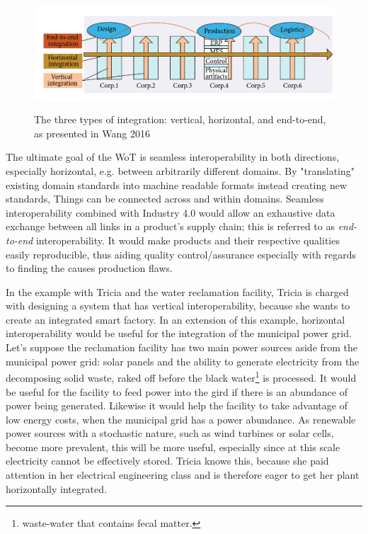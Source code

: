 \begin{figure}[th]
\centering
\includegraphics[width=\textwidth]{Figures/integration.png}
\caption{The three types of integration: vertical, horizontal, and end-to-end, as presented in Wang 2016}
\cite{wang2016implementing}
\label{fig:wangIntegration}
\end{figure}

The ultimate goal of the WoT is seamless interoperability in both directions, especially horizontal, e.g. between arbitrarily different domains. By "translating" existing domain standards into machine readable formats instead creating new standards, Things can be connected across and within domains\cite{MichahellesWoS}. Seamless interoperability combined with Industry 4.0 would allow an exhaustive data exchange between all links in a product's supply chain; this is referred to as \textit{end-to-end} interoperability. It would make products and their respective qualities easily reproducible\cite{wang2016implementing}, thus aiding quality control/assurance especially with regards to finding the causes production flaws.

In the example with Tricia and the water reclamation facility, Tricia is charged with designing a system that has vertical interoperability, because she wants to create an integrated smart factory. In an extension of this example, horizontal interoperability would be useful for the integration of the municipal power grid. Let's suppose the reclamation facility has two main power sources aside from the municipal power grid: solar panels and the ability to generate electricity from the decomposing solid waste, raked off before the black water\footnote{waste-water that contains fecal matter.} is processed. It would be useful for the facility to feed power into the gird if there is an abundance of power being generated. Likewise it would help the facility to take advantage of low energy costs, when the municipal grid has a power abundance. As renewable power sources with a stochastic nature, such as wind turbines or solar cells, become more prevalent, this will be more useful, especially since at this scale electricity cannot be effectively stored. Tricia knows this, because she paid attention in her electrical engineering class and is therefore eager to get her plant horizontally integrated.




